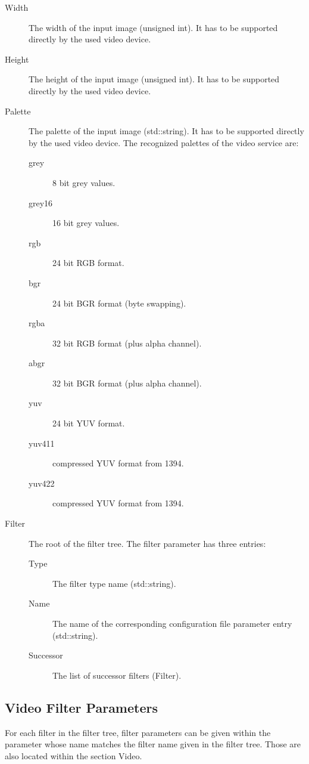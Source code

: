 \begin{description}
\item[Width] The width of the input image (unsigned int).
  It has to be supported directly by the used video device.
\item[Height] The height of the input image (unsigned int).
  It has to be supported directly by the used video device.
\item[Palette] The palette of the input image (std::string).
  It has to be supported directly by the used video device.
  The recognized palettes of the video service are:
  \begin{description}
  \item[grey] 8 bit grey values.
  \item[grey16] 16 bit grey values.
  \item[rgb] 24 bit RGB format.
  \item[bgr] 24 bit BGR format (byte swapping).
  \item[rgba] 32 bit RGB format (plus alpha channel).
  \item[abgr] 32 bit BGR format (plus alpha channel).
  \item[yuv] 24 bit YUV format.
  \item[yuv411] compressed YUV format from 1394.
  \item[yuv422] compressed YUV format from 1394.
  \end{description}
\item[Filter] The root of the filter tree. The filter parameter
  has three entries:
  \begin{description}
  \item[Type] The filter type name (std::string).
  \item[Name] The name of the corresponding configuration file
    parameter entry (std::string).
    \item[Successor] The list of successor filters (Filter).
  \end{description}
\end{description}

\subsection{Video Filter Parameters}

For each filter in the filter tree, filter parameters can be given
within the parameter whose name matches the filter name given in the
filter tree. Those are also located within the section Video.

